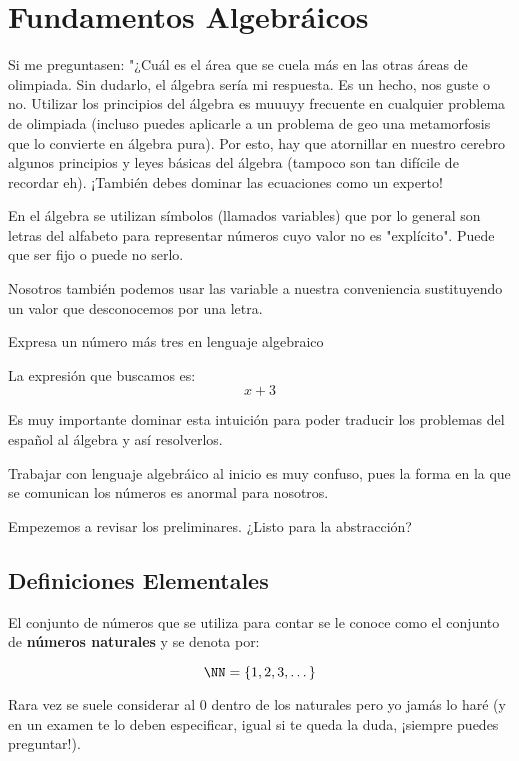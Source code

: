 \chapter{Fundamentos Algebráicos}

Si me preguntasen: "¿Cuál es el área que se cuela más en las 
otras áreas de olimpiada. Sin dudarlo, el álgebra sería mi 
respuesta. Es un hecho, nos guste o no. 
Utilizar los principios del álgebra es muuuyy frecuente 
en cualquier problema de olimpiada (incluso puedes aplicarle 
a un problema de geo una metamorfosis que lo convierte en 
álgebra pura). Por esto, hay que atornillar en nuestro 
cerebro algunos principios y leyes básicas del álgebra 
(tampoco son tan difícile de recordar eh). ¡También debes dominar 
las ecuaciones como un experto!

En el álgebra se utilizan símbolos (llamados variables) que por 
lo general son letras del alfabeto para representar números cuyo 
valor no es "explícito". Puede que ser fijo o puede no serlo.

Nosotros también podemos usar las variable a nuestra 
conveniencia sustituyendo un valor que desconocemos por una 
letra.  

\begin{example}
Expresa un número más tres en lenguaje algebraico 
\end{example}

La expresión que buscamos es:
\[x+3\]

Es muy importante dominar esta 
intuición para poder traducir los problemas del 
español al álgebra y así resolverlos. 

Trabajar con lenguaje algebráico al inicio es muy confuso, 
pues la forma en la que se comunican los números es anormal 
para nosotros. 

Empezemos a revisar los preliminares. 
¿Listo para la abstracción?

\section{Definiciones Elementales}

El conjunto de números que se utiliza para contar se 
le conoce como el conjunto de \textbf{números naturales} 
y se denota por: 

\[\NN = \{1, 2, 3, \dots\}\]

Rara vez se suele considerar al $0$ dentro de los naturales 
pero yo jamás lo haré (y en un examen te lo deben especificar, 
igual si te queda la duda, ¡siempre puedes preguntar!).


